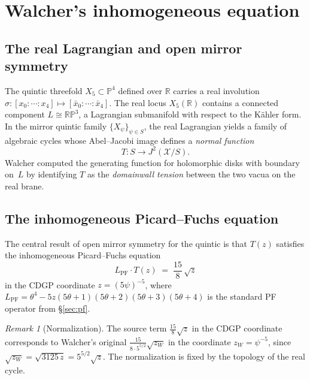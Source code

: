 \documentclass[11pt]{article}
\theoremstyle{plain}
\theoremstyle{definition}
\theoremstyle{remark}
\newtheorem{remark}[theorem]{Remark}
\newcommand{\R}{\mathbb{R}}
\newcommand{\PP}{\mathbb{P}}
\begin{document}
\section{Walcher's inhomogeneous equation}
\label{sec:griffiths}

\subsection{The real Lagrangian and open mirror symmetry}

The quintic threefold $X_5 \subset \PP^4$ defined over $\R$ carries a real involution $\sigma: [x_0:\cdots:x_4] \mapsto [\bar{x}_0:\cdots:\bar{x}_4]$. The real locus $X_5(\R)$ contains a connected component $L \cong \R\PP^3$, a Lagrangian submanifold with respect to the K\"ahler form. In the mirror quintic family $\{X_\psi\}_{\psi \in S}$, the real Lagrangian yields a family of algebraic cycles whose Abel--Jacobi image defines a \emph{normal function}
\[
T: S \longrightarrow J^2(\mathcal{X}/S).
\]
Walcher \cite{walcher} computed the generating function for holomorphic disks with boundary on~$L$ by identifying $T$ as the \emph{domainwall tension} between the two vacua on the real brane.

\subsection{The inhomogeneous Picard--Fuchs equation}

The central result of open mirror symmetry for the quintic \cite{walcher,morrison-walcher} is that $T(z)$ satisfies the inhomogeneous Picard--Fuchs equation
\begin{equation}\label{eq:walcher}
L_{\mathrm{PF}} \cdot T(z) \;=\; \frac{15}{8}\,\sqrt{z}
\end{equation}
in the CDGP coordinate $z = (5\psi)^{-5}$, where $L_{\mathrm{PF}} = \theta^4 - 5z(5\theta+1)(5\theta+2)(5\theta+3)(5\theta+4)$ is the standard PF operator from \S\ref{sec:pf}.

\begin{remark}[Normalization]\label{rmk:normalization}
The source term $\tfrac{15}{8}\sqrt{z}$ in the CDGP coordinate corresponds to Walcher's original $\tfrac{15}{8\cdot 5^{5/2}}\sqrt{z_W}$ in the coordinate $z_W = \psi^{-5}$, since $\sqrt{z_W} = \sqrt{3125\,z} = 5^{5/2}\sqrt{z}$. The normalization is fixed by the topology of the real cycle.
\end{remark}
\end{document}
